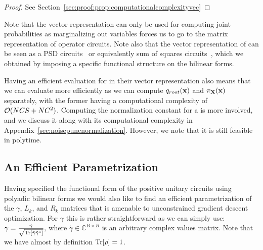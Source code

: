 \begin{proof}
	See Section~\ref{sec:proof:prop:computationalcomplexityvec}
\end{proof}

Note that the vector representation can only be used for computing joint probabilities as marginalizing out variables forces us to go to the matrix representation of operator circuits. Note also that the vector representation of \puncs can be seen as a PSD circuits~\cite{sladek2023encoding} or equivalently sum of squares circuits~\citep{loconte2024sum}, which we obtained by imposing a specific functional structure on the bilinear forms.

Having an efficient evaluation for \puncs in their vector representation also means that we can evaluate \noisepuncs more efficiently as we can compute $q_{root}(\mathbf{x})$ and $\pi_{\mathbf{X}}(\mathbf{x})$ separately, with the former having a computational complexity of $\mathcal{O}(N C S + N C^2)$.
Computing the normalization constant for a \noisepunc is more involved, and we discuss it along with its computational complexity in Appendix~\ref{sec:noisepuncnormalization}. However, we note that it is still feasible in polytime.




















\subsection{An Efficient Parametrization}
\label{sec:efficient_param}

Having specified the functional form of the positive unitary circuits using polyadic bilinear forms we would also like to find an efficient parametrization of the $\gamma$, $L_k$, and $R_k$ matrices that is amenable to unconstrained gradient descent optimization. For $\gamma$ this is rather straightforward as we can simply use:
$
	\gamma = \frac{\tilde{\gamma}}{\sqrt{\Tr [\tilde{\gamma} \tilde{\gamma}^*]}},
$
where $\tilde{\gamma}\in \mathbb{C}^{B\times B}$ is an arbitrary complex values matrix. Note that we have almost by definition $\Tr [\rho] = 1$.


